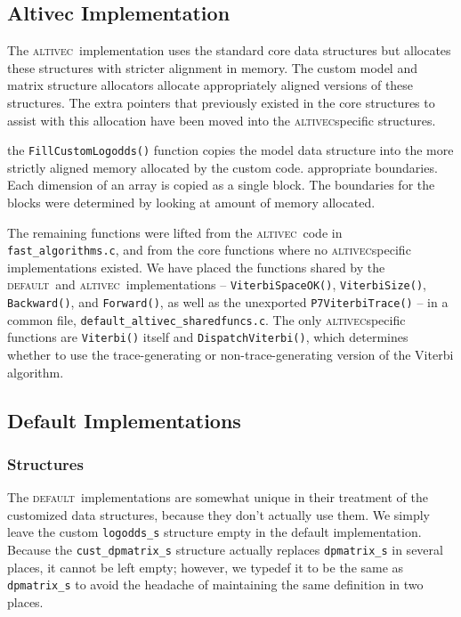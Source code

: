 \documentclass[letterpaper,10pt]{article}
\newcommand{\func}[1]{\texttt{#1()}}
\newcommand{\struct}[1]{\texttt{#1}}
\newcommand{\impl}[1]{\small{\textsc{\textsf{#1}}}}
\newcommand{\altv}{\impl{altivec}}
\newcommand{\deft}{\impl{default}}
\begin{document}
\subsection*{Altivec Implementation}

The \altv\ implementation uses the standard core data structures but
allocates these structures with stricter alignment in memory.  The
custom model and matrix structure allocators allocate appropriately
aligned versions of these structures.  The extra pointers that
previously existed in the core structures to assist with this
allocation have been moved into the \altv\-specific structures.

the \func{FillCustomLogodds} function copies the model data structure
into the more strictly aligned memory allocated by the custom code.
appropriate boundaries. Each dimension of an array is copied as a
single block.  The boundaries for the blocks were determined by
looking at amount of memory allocated.

The remaining functions were lifted from the \altv\ code in
\texttt{fast\_algorithms.c}, and from the core functions where no
\altv\-specific implementations existed.  We have placed the functions
shared by the \deft\ and \altv\ implementations --
\func{ViterbiSpaceOK}, \func{ViterbiSize}, \func{Backward}, and
\func{Forward}, as well as the unexported \func{P7ViterbiTrace} -- in
a common file, \texttt{default\_altivec\_sharedfuncs.c}.  The only
\altv\-specific functions are \func{Viterbi} itself and
\func{DispatchViterbi}, which determines whether to use the
trace-generating or non-trace-generating version of the Viterbi
algorithm.

\subsection*{Default Implementations}

\subsubsection*{Structures}

The \deft\ implementations are somewhat unique in their treatment of
the customized data structures, because they don't actually use them.
We simply leave the custom \struct{logodds\_s} structure empty in the
default implementation.  Because the \struct{cust\_dpmatrix\_s}
structure actually replaces \struct{dpmatrix\_s} in several places, it
cannot be left empty; however, we typedef it to be the same as
\struct{dpmatrix\_s} to avoid the headache of maintaining the same
definition in two places.
\end{document}
